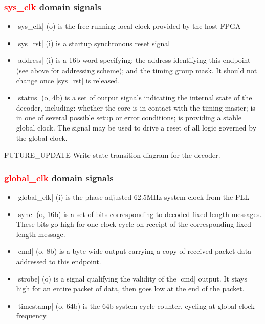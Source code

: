 \documentclass{dune}
\begin{document}
\subsubsection[sys\_clk domain signals]{\textcolor{red}{sys\_clk} domain signals}

\begin{itemize}
	\item |sys_clk| (o) is the free-running local clock provided by the host FPGA
	\item |sys_rst| (i) is a startup synchronous reset signal
	\item |address| (i) is a 16b word specifying: the address identifying this endpoint (see above for addressing scheme); and the timing group mask. It should not change once |sys_rst| is released.
	\item |status| (o, 4b) is a set of output signals indicating the internal state of the decoder, including: whether the core is in contact with the timing master; is in one of several possible setup or error conditions; is providing a stable global clock. The signal may be used to drive a reset of all logic governed by the global clock.
\end{itemize}

{\color{red}FUTURE\_UPDATE} Write state transition diagram for the decoder.

\subsubsection[global\_clk domain signals]{\textcolor{red}{global\_clk} domain signals}

\begin{itemize}
	\item |global_clk| (i) is the phase-adjusted 62.5MHz system clock from the PLL
	\item |sync| (o, 16b) is a set of bits corresponding to decoded fixed length messages. These bits go high for one clock cycle on receipt of the corresponding fixed length message.
	\item |cmd| (o, 8b) is a byte-wide output carrying a copy of received packet data addressed to this endpoint.
	\item |strobe| (o) is a signal qualifying the validity of the |cmd| output. It stays high for an entire packet of data, then goes low at the end of the packet.
	\item |timestamp| (o, 64b) is the 64b system cycle counter, cycling at global clock frequency.
\end{itemize}
\end{document}
